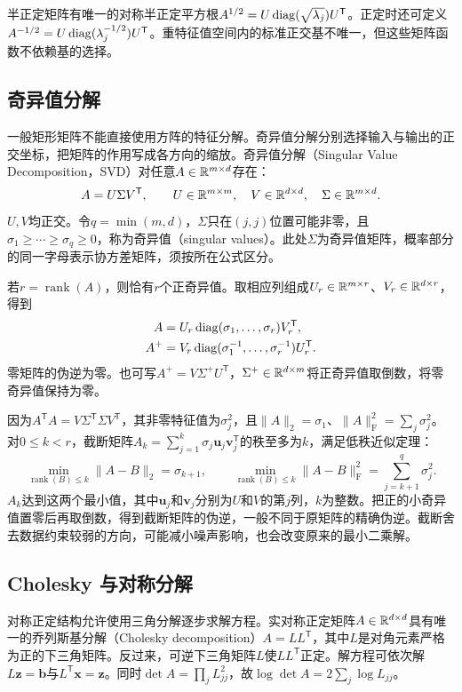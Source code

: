 半正定矩阵有唯一的对称半正定平方根$A^{1/2}=U\operatorname{diag}(\sqrt{\lambda_j})U^{\mathsf T}$。正定时还可定义$A^{-1/2}=U\operatorname{diag}(\lambda_j^{-1/2})U^{\mathsf T}$。重特征值空间内的标准正交基不唯一，但这些矩阵函数不依赖基的选择。

\subsection{奇异值分解}
一般矩形矩阵不能直接使用方阵的特征分解。奇异值分解分别选择输入与输出的正交坐标，把矩阵的作用写成各方向的缩放。奇异值分解（Singular Value Decomposition，SVD）对任意$A\in\mathbb{R}^{m\times d}$存在：
\begin{equation}
 A=U\Sigma V^{\mathsf T},\qquad U\in\mathbb{R}^{m\times m},\quad
 V\in\mathbb{R}^{d\times d},\quad\Sigma\in\mathbb{R}^{m\times d}.
\end{equation}
$U,V$均正交。令$q=\min(m,d)$，$\Sigma$只在$(j,j)$位置可能非零，且$\sigma_1\geq\cdots\geq\sigma_q\geq0$，称为奇异值（singular values）。此处$\Sigma$为奇异值矩阵，概率部分的同一字母表示协方差矩阵，须按所在公式区分。

若$r=\operatorname{rank}(A)$，则恰有$r$个正奇异值。取相应列组成$U_r\in\mathbb{R}^{m\times r}$、$V_r\in\mathbb{R}^{d\times r}$，得到
\begin{align}
 A&=U_r\operatorname{diag}(\sigma_1,\ldots,\sigma_r)V_r^{\mathsf T},\\
 A^+&=V_r\operatorname{diag}(\sigma_1^{-1},\ldots,\sigma_r^{-1})U_r^{\mathsf T}.
\end{align}
零矩阵的伪逆为零。也可写$A^+=V\Sigma^+U^{\mathsf T}$，$\Sigma^+\in\mathbb{R}^{d\times m}$将正奇异值取倒数，将零奇异值保持为零。

因为$A^{\mathsf T}A=V\Sigma^{\mathsf T}\Sigma V^{\mathsf T}$，其非零特征值为$\sigma_j^2$，且$\|A\|_2=\sigma_1$、$\|A\|_{\mathrm F}^2=\sum_j\sigma_j^2$。对$0\leq k<r$，截断矩阵$A_k=\sum_{j=1}^k\sigma_j\bm u_j\bm v_j^{\mathsf T}$的秩至多为$k$，满足低秩近似定理：
\begin{equation}
 \min_{\operatorname{rank}(B)\leq k}\|A-B\|_2=\sigma_{k+1},\qquad
 \min_{\operatorname{rank}(B)\leq k}\|A-B\|_{\mathrm F}^2=\sum_{j=k+1}^q\sigma_j^2.
\end{equation}
$A_k$达到这两个最小值，其中$\bm u_j$和$\bm v_j$分别为$U$和$V$的第$j$列，$k$为整数。把正的小奇异值置零后再取倒数，得到截断矩阵的伪逆，一般不同于原矩阵的精确伪逆。截断舍去数据约束较弱的方向，可能减小噪声影响，也会改变原来的最小二乘解。

\subsection{Cholesky 与对称分解}
对称正定结构允许使用三角分解逐步求解方程。实对称正定矩阵$A\in\mathbb{R}^{d\times d}$具有唯一的乔列斯基分解（Cholesky decomposition）$A=LL^{\mathsf T}$，其中$L$是对角元素严格为正的下三角矩阵。反过来，可逆下三角矩阵$L$使$LL^{\mathsf T}$正定。解方程可依次解$L\bm z=\bm b$与$L^{\mathsf T}\bm x=\bm z$。同时$\det A=\prod_jL_{jj}^2$，故$\log\det A=2\sum_j\log L_{jj}$。

